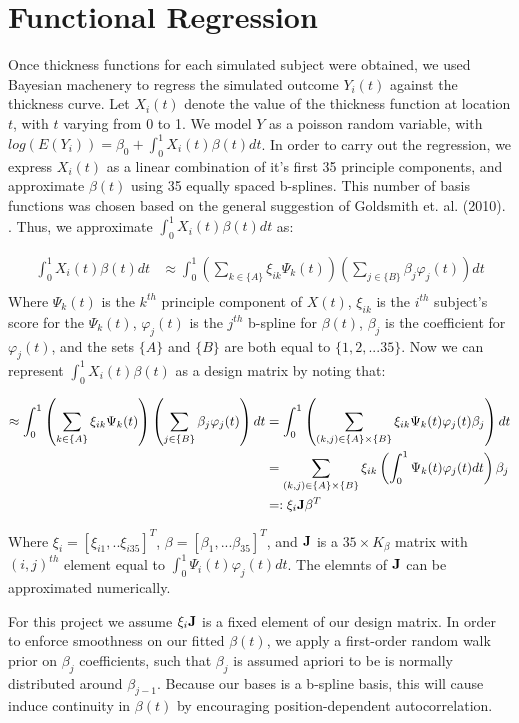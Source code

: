 \documentclass[12pt]{article}
\newcommand{\es}[1]{\begin{equation*}\begin{split} #1 \end{split} \end{equation*}}
\begin{document}
\section{Functional Regression}
Once thickness functions for each simulated subject were obtained, we used Bayesian machenery to regress the simulated outcome $Y_i(t)$ against the thickness curve. Let $X_i(t)$ denote the value of the thickness function at location $t$, with $t$ varying from $0$ to 1. We model $Y$ as a poisson random variable, with $log(E(Y_i)) = \beta_0+ \int_0^1 X_i(t)\beta(t)dt$. In order to carry out the regression, we express $X_i(t)$ as a linear combination of it's first 35 principle components, and approximate $\beta(t)$ using 35 equally spaced b-splines. This number of basis functions was chosen based on the general suggestion of Goldsmith et. al. (2010). \cite{goldsmith2010penalized}. Thus, we approximate $\int_0^1 X_i(t)\beta(t)dt$ as:

\es{
\int_0^1 X_i(t)\beta(t) dt & \approx \int_0^1 \left( \sum_{k\in \{A\} } \xi_{ik} \Psi_k(t) \right) \left( \sum_{ j\in \{ B\}} \beta_j \varphi_j(t)  \right)dt   \\
}
Where $\Psi_k(t)$ is the $k^{th}$ principle component of $X(t)$, $\xi_{ik}$ is the $i^{th}$ subject's score for the $\Psi_k(t)$, $\varphi_j(t)$ is the $j^{th}$ b-spline for $\beta(t)$, $\beta_j$ is the coefficient for $\varphi_j(t)$, and the sets $\{A\}$ and $\{B\}$ are both equal to $\{1,2,... 35 \}$. Now we can represent $\int_0^1 X_i(t)\beta(t)$ as a design matrix by noting that:

\es{
 \approx \int_0^1 \left( \sum_{k\in \{A\} } \xi_{ik} \Psi_k(t) \right) \left( \sum_{ j\in \{ B\}} \beta_j \varphi_j(t)  \right)dt    &=\int_0^1 \left(  \sum_{(k,j)\in \{A\}\times \{B\} } \xi_{ik} \Psi_k(t)    \varphi_j(t)   \beta_j \right) dt \\
 &=  \sum_{(k,j)\in \{A\}\times \{B\} } \xi_{ik}  \left( \int_0^1 \Psi_k(t)    \varphi_j(t)  dt \right) \beta_j  \\
 &=: \xi_{i} \bold{J} \beta^T  \\
 }

Where $\xi_i=[\xi_{i1},..\xi_{i35}]^T$, $\beta=[\beta_1,...\beta_{35}]^T$, and $\bold{J}$ is a $35 \times K_\beta$ matrix with $(i,j)^{th}$ element equal to $ \int_0^1 \Psi_i(t)    \varphi_j(t) dt$. The elemnts of $\bold{J}$ can be approximated numerically. \cite{goldsmith2010penalized} \cite{crainiceanu2010bayesian}

For this project we assume $\xi_{i} \bold{J}$ is a fixed element of our design matrix. In order to enforce smoothness on our fitted $\beta(t)$, we apply a first-order random walk prior on $\beta_j$ coefficients, such that $\beta_j$ is assumed apriori to be is normally distributed around $\beta_{j-1}$. Because our bases is a b-spline basis, this will cause induce continuity in $\beta(t)$ by encouraging position-dependent autocorrelation.\cite{crainiceanu2010bayesian}
\cite{lang2004bayesian}
\cite{Brezger:Kneib:Lang:2005:BaysX}
\end{document}

